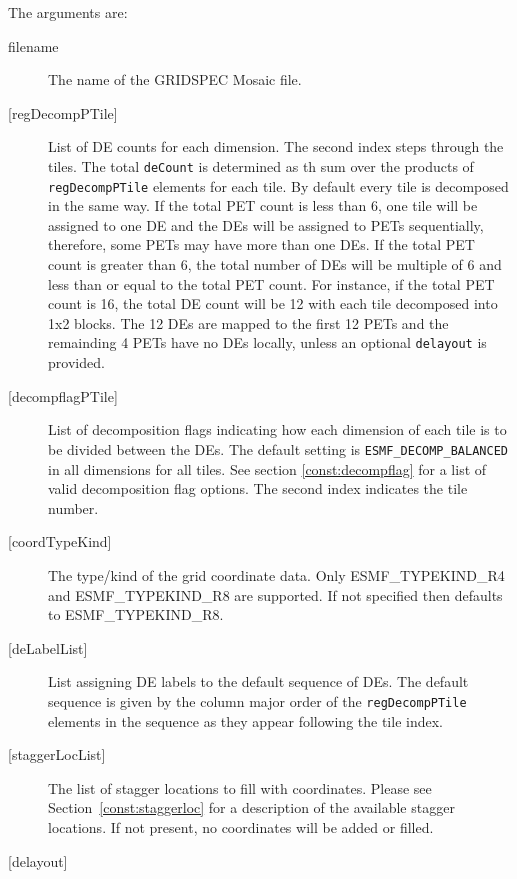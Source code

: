   
       The arguments are:
       \begin{description}
       \item[filename]
            The name of the GRIDSPEC Mosaic file.
       \item[{[regDecompPTile]}]
            List of DE counts for each dimension. The second index steps through
            the tiles. The total {\tt deCount} is determined as th sum over
            the products of {\tt regDecompPTile} elements for each tile.
            By default every tile is decomposed in the same way.  If the total
            PET count is less than 6, one tile will be assigned to one DE and the DEs
            will be assigned to PETs sequentially, therefore, some PETs may have
            more than one DEs.  If the total PET count is greater than 6, the total
            number of DEs will be multiple of 6 and less than or equal to the total
            PET count.  For instance, if the total PET count is 16, the total DE count
            will be 12 with each tile decomposed into 1x2 blocks.  The 12 DEs are mapped
            to the first 12 PETs and the remainding 4 PETs have no DEs locally, unless
            an optional {\tt delayout} is provided.
       \item[{[decompflagPTile]}]
            List of decomposition flags indicating how each dimension of each
            tile is to be divided between the DEs. The default setting
            is {\tt ESMF\_DECOMP\_BALANCED} in all dimensions for all tiles.
            See section \ref{const:decompflag} for a list of valid decomposition
            flag options. The second index indicates the tile number.
       \item[{[coordTypeKind]}]
            The type/kind of the grid coordinate data. Only ESMF\_TYPEKIND\_R4
            and ESMF\_TYPEKIND\_R8 are supported.
            If not specified then defaults to ESMF\_TYPEKIND\_R8.
       \item[{[deLabelList]}]
            List assigning DE labels to the default sequence of DEs. The default
            sequence is given by the column major order of the {\tt regDecompPTile}
            elements in the sequence as they appear following the tile index.
       \item[{[staggerLocList]}]
            The list of stagger locations to fill with coordinates. Please see Section~\ref{const:staggerloc}
            for a description of the available stagger locations. If not present, no coordinates
            will be added or filled.
       \item[{[delayout]}]

\end{description}
